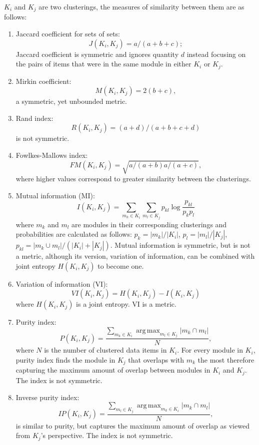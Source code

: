 \documentclass[12pt]{cmuthesis}
\DeclareMathOperator*{\argmax}{arg\,max}
\begin{document}
  $K_i$ and $K_j$ are two clusterings, the measures of similarity between them are as follows:
  \begin{enumerate}
    \item Jaccard coefficient for sets of sets:
    \[
    J(K_i, K_j) = a / (a + b + c);
    \]
    Jaccard coefficient is symmetric and ignores quantity $d$ instead focusing on the pairs of items that were in the same module in either $K_i$ or $K_j$.

    \item Mirkin coefficient:
    \[
    M(K_i, K_j) = 2(b + c),
    \]
    a symmetric, yet unbounded metric.

    \item Rand index:
    \[
    R(K_i, K_j) = (a + d) / (a + b + c + d)
    \]
    is not symmetric.

    \item Fowlkes-Mallows index:
    \[
    FM(K_i, K_j) = \sqrt{a / (a + b) a / (a + c) },
    \]
    where higher values correspond to greater similarity between the clusterings.

    \item Mutual information (MI):
    \[
    I(K_i,K_j) = \sum_{m_k \in K_i} \sum_{m_l \in K_j} p_{kl} 
        \log \frac{ p_{kl} }{ p_k p_l }
    \]
    where $m_k$ and $m_l$ are modules in their corresponding clusterings and probabilities are calculated as follows: $p_k = |m_k| / |K_i|$, $p_l = |m_l| / |K_j|$, $p_{kl} = |m_k \cup m_l| / (|K_i| + |K_j|)$. Mutual information is symmetric, but is not a metric, although its version, variation of information, can be combined with joint entropy $H(K_i, K_j)$ to become one.

    \item Variation of information (VI):
    \[
    VI(K_i,K_j) = H(K_i, K_j) - I(K_i, K_j)
    \]
    where $H(K_i, K_j)$ is a joint entropy. VI is a metric.

    \item Purity index:
    \[
    P(K_i,K_j) = \frac{ \sum_{m_k \in K_i} \argmax_{m_l \in K_j} |m_k \cap m_l| }{N},
    \]
    where $N$ is the number of clustered data items in $K_i$. For every module in $K_i$, purity index finds the module in $K_j$ that overlaps with $m_k$ the most therefore capturing the maximum amount of overlap between modules in $K_i$ and $K_j$. The index is not symmetric.

    \item Inverse purity index:
    \[
    IP(K_i,K_j) = \frac{ \sum_{m_l \in K_j} \argmax_{m_k \in K_i} |m_k \cap m_l| }{N},
    \]
    is similar to purity, but captures the maximum amount of overlap as viewed from $K_j$'s perspective. The index is not symmetric.


\end{enumerate}
\end{document}
